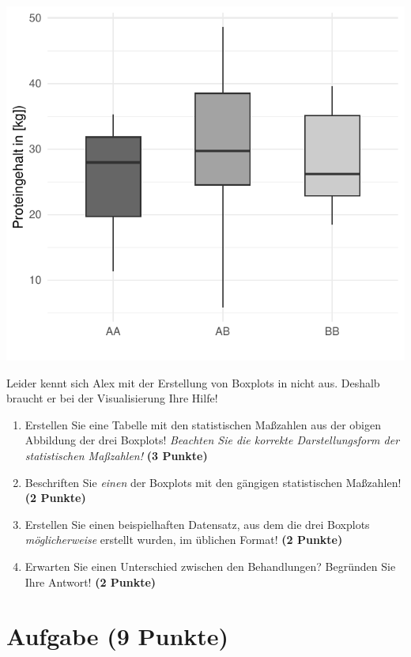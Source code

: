 \documentclass[a4paper, 9pt]{scrartcl}\usepackage[]{graphicx}\usepackage[]{xcolor}
\makeatletter
\def\maxwidth{ %
  \ifdim\Gin@nat@width>\linewidth
    \linewidth
  \else
    \Gin@nat@width
  \fi
}
\makeatother
\begin{document}
{\centering \includegraphics[width=\maxwidth]{img/boxplot-02-zer-1} 

}




Leider kennt sich Alex mit der Erstellung von Boxplots in \Rlogo nicht aus. Deshalb braucht er bei der Visualisierung Ihre Hilfe!

\begin{enumerate}
\item Erstellen Sie eine Tabelle mit den statistischen Maßzahlen aus der
  obigen Abbildung der drei Boxplots! \textit{Beachten Sie die korrekte
    Darstellungsform der statistischen Maßzahlen!} \textbf{(3 Punkte)}
\item Beschriften Sie \textit{einen} der Boxplots mit den gängigen
  statistischen Maßzahlen! \textbf{(2 Punkte)}
\item Erstellen Sie einen beispielhaften Datensatz, aus dem die drei
  Boxplots \textit{möglicherweise} erstellt wurden, im \Rlogo üblichen Format! \textbf{(2 Punkte)}
\item Erwarten Sie einen Unterschied zwischen den Behandlungen? Begründen
  Sie Ihre Antwort! \textbf{(2 Punkte)}
\end{enumerate} 
\clearpage

\section{Aufgabe \hfill (9 Punkte)}
\end{document}
